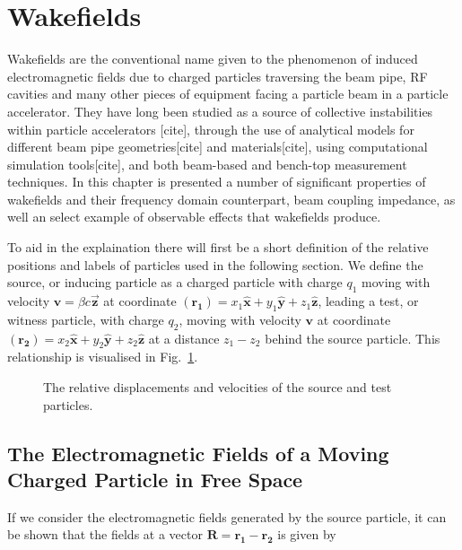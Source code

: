 \section{Wakefields}

Wakefields are the conventional name given to the phenomenon of induced electromagnetic fields due to charged particles traversing the beam pipe, RF cavities and many other pieces of equipment facing a particle beam in a particle accelerator. They have long been studied as a source of collective instabilities within particle accelerators [cite], through the use of analytical models for different beam pipe geometries[cite] and materials[cite], using computational simulation tools[cite], and both beam-based and bench-top measurement techniques. In this chapter is presented a number of significant properties of wakefields and their frequency domain counterpart, beam coupling impedance, as well an select example of observable effects that wakefields produce.

To aid in the explaination there will first be a short definition of the relative positions and labels of particles used in the following section. We define the source, or inducing particle as a charged particle with charge $q_{1}$ moving with velocity $\mathbf{v} = \beta{}c \mathbf{\vec{z}}$ at coordinate $\left( \mathbf{r_{1}} \right) = x_{1}\mathbf{\hat{x}} + y_{1}\mathbf{\hat{y}} + z_{1} \mathbf{\hat{z}}$, leading a test, or witness particle, with charge $q_{2}$, moving with velocity $\mathbf{v}$ at coordinate $\left( \mathbf{r_{2}} \right) = x_{2}\mathbf{\hat{x}} + y_{2}\mathbf{\hat{y}} + z_{2} \mathbf{\hat{z}}$ at a distance $z_{1} - z_{2}$ behind the source particle. This relationship is visualised in Fig.~\ref{fig:source_and_wit}.

\begin{figure}

\caption{The relative displacements and velocities of the source and test particles.}
\label{fig:source_and_wit}
\end{figure} 

\subsection{The Electromagnetic Fields of a Moving Charged Particle in Free Space}

If we consider the electromagnetic fields generated by the source particle, it can be shown that the fields at a vector $\mathbf{R} = \mathbf{r_{1}} - \mathbf{r_{2}}$ is given by

